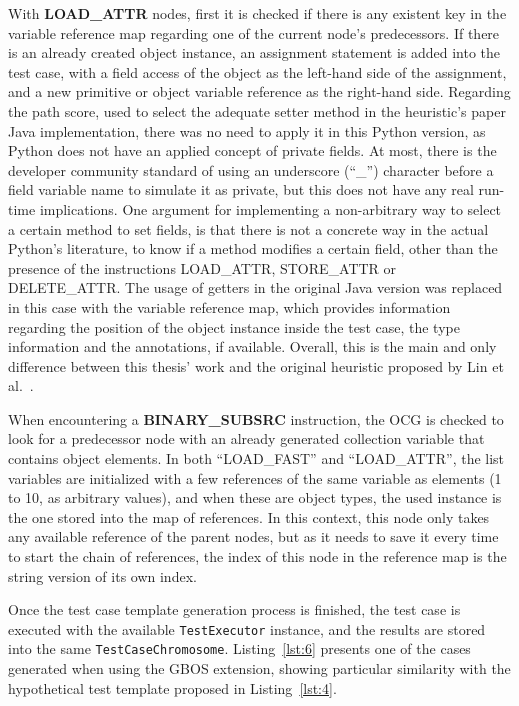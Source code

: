 \documentclass[%
  chapterprefix=false,%
  open=right,%
  twoside=true,%
  paper=a4,%
  logofile={Figures/logo.png},%
  thesistype=master,%
  UKenglish,%
]{se2thesis}
\newcommand{\classname}[1]{\texttt{#1}}
\begin{document}
With \textbf{LOAD\_ATTR} nodes, first it is checked if there is any existent key in the variable reference map regarding one of the current node's predecessors. 
If there is an already created object instance, an assignment statement is added into the test case, with a field access of the object as the left-hand side of the assignment, and a new primitive or object variable reference as the right-hand side.
Regarding the path score, used to select the adequate setter method in the heuristic's paper Java implementation, there was no need to apply it in this Python version, as Python does not have an applied concept of private fields.
At most, there is the developer community standard of using an underscore (``\_'') character before a field variable name to simulate it as private, but this does not have any real run-time implications.
One argument for implementing a non-arbitrary way to select a certain method to set fields, is that there is not a concrete way in the actual Python's literature, to know if a method modifies a certain field, other than the presence of the instructions LOAD\_ATTR, STORE\_ATTR or DELETE\_ATTR.\@
The usage of getters in the original Java version was replaced in this case with the variable reference map, which provides information regarding the position of the object instance inside the test case, the type information and the annotations, if available.
Overall, this is the main and only difference between this thesis' work and the original heuristic proposed by Lin et al.~\cite{DBLP:conf/sigsoft/0001O00D21}.

When encountering a \textbf{BINARY\_SUBSRC} instruction, the OCG is checked to look for a predecessor node with an already generated collection variable that contains object elements.
In both ``LOAD\_FAST'' and ``LOAD\_ATTR'', the list variables are initialized with a few references of the same variable as elements (1 to 10, as arbitrary values), and when these are object types, the used instance is the one stored into the map of references.
In this context, this node only takes any available reference of the parent nodes, but as it needs to save it every time to start the chain of references, the index of this node in the reference map is the string version of its own index.

Once the test case template generation process is finished, the test case is executed with the available \classname{TestExecutor} instance, and the results are stored into the same \classname{TestCaseChromosome}.
Listing~\ref{lst:6} presents one of the cases generated when using the GBOS extension, showing particular similarity with the hypothetical test template proposed in Listing~\ref{lst:4}.
\end{document}

